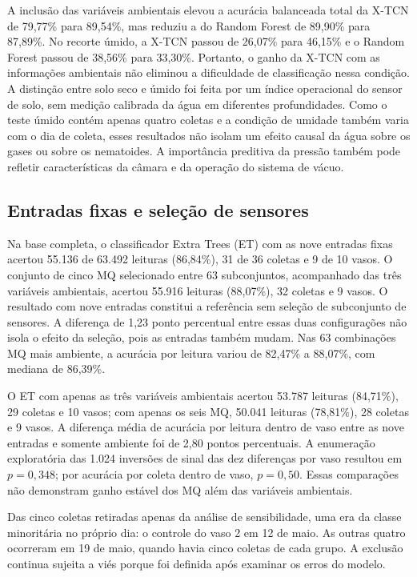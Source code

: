 A inclusão das variáveis ambientais elevou a acurácia balanceada total da
X-TCN de 79,77\% para 89,54\%, mas reduziu a do Random Forest de 89,90\% para
87,89\%. No recorte úmido, a X-TCN passou de 26,07\% para 46,15\% e o Random
Forest passou de 38,56\% para 33,30\%. Portanto, o ganho da X-TCN com as
informações ambientais não eliminou a dificuldade de classificação nessa
condição. A distinção entre solo seco e úmido foi feita por um índice
operacional do sensor de solo, sem medição calibrada da água em diferentes
profundidades. Como o teste úmido contém apenas quatro coletas e a condição de
umidade também varia com o dia de coleta, esses resultados não isolam um efeito
causal da água sobre os gases ou sobre os nematoides. A importância preditiva
da pressão também pode refletir características da câmara e da operação do
sistema de vácuo.



\subsection{Entradas fixas e seleção de sensores}
\label{subsec:resultados_entradas_fixas}

Na base completa, o classificador Extra Trees (ET) com as nove entradas
fixas acertou 55.136 de
63.492 leituras (86,84\%), 31 de 36 coletas e 9 de 10 vasos. O conjunto
de cinco MQ selecionado entre 63 subconjuntos, acompanhado das três
variáveis ambientais, acertou 55.916 leituras (88,07\%), 32 coletas e
9 vasos. O resultado com nove entradas constitui a referência sem
seleção de subconjunto de sensores. A diferença de 1,23 ponto percentual
entre essas duas configurações não isola o efeito da seleção, pois as
entradas também mudam. Nas 63 combinações MQ mais ambiente, a acurácia
por leitura variou de 82,47\% a 88,07\%, com mediana de 86,39\%.

O ET com apenas as três variáveis ambientais acertou 53.787 leituras
(84,71\%), 29 coletas e 10 vasos; com apenas os seis MQ, 50.041 leituras
(78,81\%), 28 coletas e 9 vasos. A diferença média de acurácia por
leitura dentro de vaso entre as nove entradas e somente ambiente foi de
2,80 pontos percentuais. A enumeração exploratória das 1.024 inversões
de sinal das dez diferenças por vaso resultou em $p=0{,}348$; por acurácia
por coleta dentro de vaso, $p=0{,}50$. Essas comparações não demonstram
ganho estável dos MQ além das variáveis ambientais.

Das cinco coletas retiradas apenas da análise de sensibilidade, uma era
da classe minoritária no próprio dia: o controle do vaso 2 em 12 de maio.
As outras quatro ocorreram em 19 de maio, quando havia cinco coletas de
cada grupo. A exclusão continua sujeita a viés porque foi definida após
examinar os erros do modelo.

